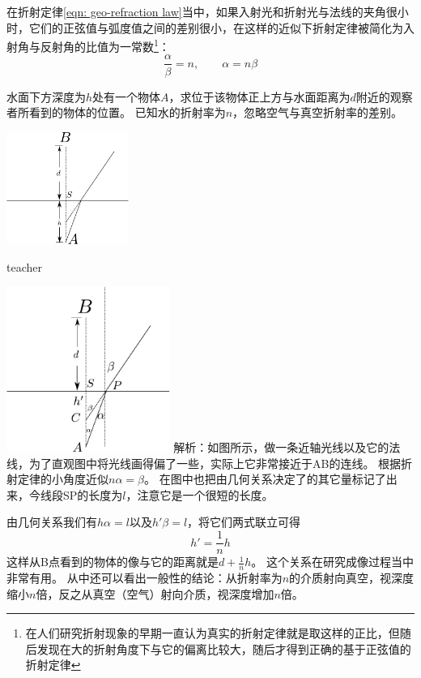 在折射定律\ref{eqn: geo-refraction law}当中，如果入射光和折射光与法线的夹角很小时，它们的正弦值与弧度值之间的差别很小，在这样的近似下折射定律被简化为入射角与反射角的比值为一常数\footnote{在人们研究折射现象的早期一直认为真实的折射定律就是取这样的正比，但随后发现在大的折射角度下与它的偏离比较大，随后才得到正确的基于正弦值的折射定律}：
\begin{equation}
\frac{\alpha}{\beta}=n,\qquad \alpha = n\beta
\end{equation}

\begin{example}
水面下方深度为$h$处有一个物体$A$，求位于该物体正上方与水面距离为$d$附近的观察者所看到的物体的位置。
已知水的折射率为$n$，忽略空气与真空折射率的差别。

\begin{flushright}
\includegraphics[width = 0.3\textwidth]{images/depth-look.pdf}
\end{flushright}
\begin{taggedblock}{teacher}

\includegraphics[width = 0.4\textwidth]{images/depth-look-solution.pdf}
\newline
解析：如图所示，做一条近轴光线以及它的法线，为了直观图中将光线画得偏了一些，实际上它非常接近于AB的连线。
根据折射定律的小角度近似$n\alpha = \beta$。
在图中也把由几何关系决定了的其它量标记了出来，今线段SP的长度为$l$，注意它是一个很短的长度。

由几何关系我们有$h\alpha = l$以及$h'\beta = l$，将它们两式联立可得
\[
h' = \frac{1}{n}h
\]
这样从B点看到的物体的像与它的距离就是$d+\frac{1}{n}h$。
这个关系在研究成像过程当中非常有用。
从中还可以看出一般性的结论：从折射率为$n$的介质射向真空，视深度缩小$n$倍，反之从真空（空气）射向介质，视深度增加$n$倍。
\end{taggedblock}
\end{example}


